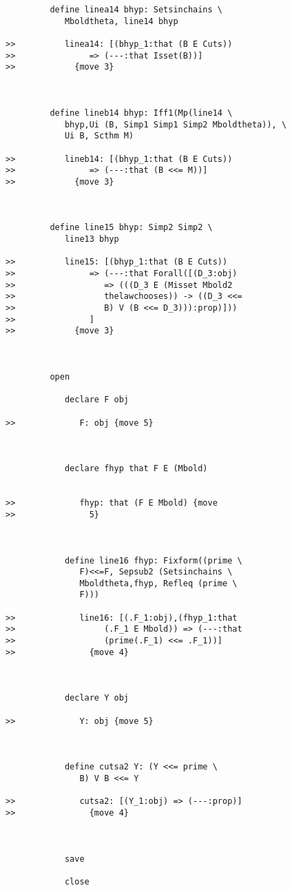 \documentclass[12pt]{article}
\begin{document}
\begin{verbatim}
         define linea14 bhyp: Setsinchains \
            Mboldtheta, line14 bhyp

>>          linea14: [(bhyp_1:that (B E Cuts))
>>               => (---:that Isset(B))]
>>            {move 3}



         define lineb14 bhyp: Iff1(Mp(line14 \
            bhyp,Ui (B, Simp1 Simp1 Simp2 Mboldtheta)), \
            Ui B, Scthm M)

>>          lineb14: [(bhyp_1:that (B E Cuts))
>>               => (---:that (B <<= M))]
>>            {move 3}



         define line15 bhyp: Simp2 Simp2 \
            line13 bhyp

>>          line15: [(bhyp_1:that (B E Cuts))
>>               => (---:that Forall([(D_3:obj)
>>                  => (((D_3 E (Misset Mbold2
>>                  thelawchooses)) -> ((D_3 <<=
>>                  B) V (B <<= D_3))):prop)]))
>>               ]
>>            {move 3}



         open

            declare F obj

>>             F: obj {move 5}



            declare fhyp that F E (Mbold)


>>             fhyp: that (F E Mbold) {move
>>               5}



            define line16 fhyp: Fixform((prime \
               F)<<=F, Sepsub2 (Setsinchains \
               Mboldtheta,fhyp, Refleq (prime \
               F)))

>>             line16: [(.F_1:obj),(fhyp_1:that
>>                  (.F_1 E Mbold)) => (---:that
>>                  (prime(.F_1) <<= .F_1))]
>>               {move 4}



            declare Y obj

>>             Y: obj {move 5}



            define cutsa2 Y: (Y <<= prime \
               B) V B <<= Y

>>             cutsa2: [(Y_1:obj) => (---:prop)]
>>               {move 4}



            save

            close


\end{verbatim}
\end{document}

